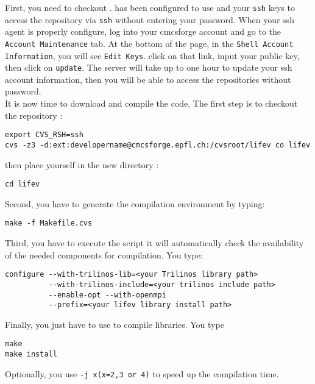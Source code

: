 \noindent First, you need to checkout \lifev.  has
been configured to use  and your \verb!ssh! keys to
access the repository via \verb!ssh! without entering your password.
When your ssh agent is properly configure, log into your cmcsforge account and
go to the \verb!Account Maintenance! tab. At the bottom of the page, in the
\verb!Shell Account Information!, you will see \verb!Edit Keys!. click on that link,
input your public key, then click on \verb!update!. The server will take up to one
hour to update your ssh account information, then you will be able to access the
repositories without password.\\

It is now time to download and compile the code. The first step is to checkout the repository :

\begin{verbatim}
export CVS_RSH=ssh
cvs -z3 -d:ext:developername@cmcsforge.epfl.ch:/cvsroot/lifev co lifev
\end{verbatim}

then place yourself in the new directory :

\begin{verbatim}
cd lifev
\end{verbatim}

\noindent Second, you have to generate the compilation environment by typing:
\begin{verbatim}
make -f Makefile.cvs
\end{verbatim}

\noindent Third, you have to execute the script
it will automatically check the availability of the needed components
for \lifev compilation. You type:

\begin{verbatim}
configure --with-trilinos-lib=<your Trilinos library path>
          --with-trilinos-include=<your trilinos include path>
          --enable-opt --with-openmpi
          --prefix=<your lifev library install path>
\end{verbatim}

\noindent Finally, you just have to use  to compile \lifev libraries. You type
\begin{verbatim}
make
make install
\end{verbatim}
Optionally, you use \verb!-j x(x=2,3 or 4)! to speed up the compilation time.

